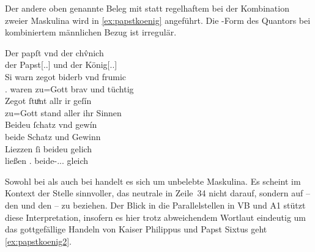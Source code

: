Der andere oben genannte Beleg mit  statt regelhaftem 
bei der Kombination zweier Maskulina wird in \cref{ex:papstkoenig} angeführt.
Die -Form des Quantors bei kombiniertem männlichen Bezug ist
irregulär. %

\begin{exe}
\ex\label{ex:papstkoenig} %
	\gll Der papſt vnd der chv̂nich \\
		der Papst[\Nom.\Sg.\MascM] und der König[\Nom.\Sg.\MascM] \\
\sn \gll Si warn zegot biderb vnd frumic \\
		\Tpl\subM.\Nom{} waren {zu=Gott} brav und tüchtig \\
\sn \gll Zegot ſtuͦnt allr ir geſín \\
		{zu=Gott} stand aller ihr Sinnen \\
\sn \gll Beideu ſchatz vnd gewín \\
		beide Schatz und Gewinn \\
\sn \gll Liezzen ſi beideu gelich \\
		ließen \Tpl\subM.\Nom{} beide-\Nom.\Pl.\NeutM.\St{} gleich \\
	\begin{taggedline}{\parencites[\pno~17vb,30--34]{kc:B1}[vgl. abweichend][6110--6113]{schroeder1895}}
	\trans {}
	\end{taggedline}
\end{exe}

Sowohl bei   als auch bei  
handelt es sich um unbelebte Maskulina. Es scheint im Kontext der Stelle
sinnvoller, das neutrale  in Zeile~34 nicht darauf, sondern auf
 -- den   und den   --
zu beziehen. Der Blick in die Parallelstellen in VB und
A1 stützt diese Interpretation, insofern es hier trotz abweichendem
Wortlaut eindeutig um das gottgefällige Handeln von Kaiser Philippus und Papst
Sixtus geht \cref{ex:papstkoenig2}.

